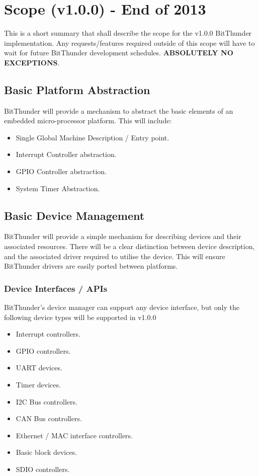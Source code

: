 \section{Scope (v1.0.0) - End of 2013}
This is a short summary that shall describe the scope for the v1.0.0 BitThunder implementation.
Any requests/features required outside of this scope will have to wait for future BitThunder development
schedules. \textbf{ABSOLUTELY NO EXCEPTIONS}.

\subsection{Basic Platform Abstraction}
BitThunder will provide a mechanism to abstract the basic elements of an embedded micro-processor platform.
This will include:

\begin{itemize}
\item Single Global Machine Description / Entry point.
\item Interrupt Controller abstraction.
\item GPIO Controller abstraction.
\item System Timer Abstraction.
\end{itemize}

\subsection{Basic Device Management}
BitThunder will provide a simple mechanism for describing devices and their associated resources.
There will be a clear distinction between device description, and the associated driver required
to utilise the device. This will ensure BitThunder drivers are easily ported between platforms.

\subsubsection{Device Interfaces / APIs}
BitThunder's device manager can support any device interface, but only the following device types
will be supported in v1.0.0

\begin{itemize}
\item Interrupt controllers.
\item GPIO controllers.
\item UART devices.
\item Timer devices.
\item I2C Bus controllers.
\item CAN Bus controllers.
\item Ethernet / MAC interface controllers.
\item Basic block devices.
\item SDIO controllers.
\end{itemize}

